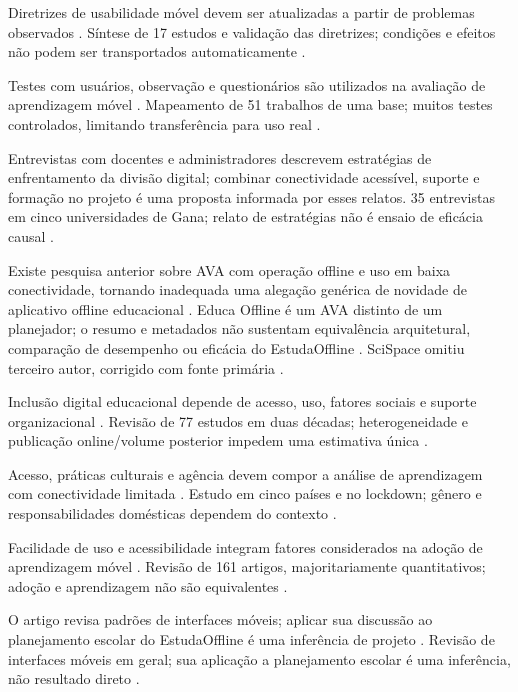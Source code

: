 Diretrizes de usabilidade móvel devem ser atualizadas a partir de problemas observados \citep{kumarguideline2019}. Síntese de 17 estudos e validação das diretrizes; condições e efeitos não podem ser transportados automaticamente \citep{kumarguideline2019}.

Testes com usuários, observação e questionários são utilizados na avaliação de aprendizagem móvel \citep{kumarmapping2024}. Mapeamento de 51 trabalhos de uma base; muitos testes controlados, limitando transferência para uso real \citep{kumarmapping2024}.

Entrevistas com docentes e administradores descrevem estratégias de enfrentamento da divisão digital; combinar conectividade acessível, suporte e formação no projeto é uma proposta informada por esses relatos. 35 entrevistas em cinco universidades de Gana; relato de estratégias não é ensaio de eficácia causal \citep{kumiyeboah2023}.

Existe pesquisa anterior sobre AVA com operação offline e uso em baixa conectividade, tornando inadequada uma alegação genérica de novidade de aplicativo offline educacional \citep{linhalis2026}. Educa Offline é um AVA distinto de um planejador; o resumo e metadados não sustentam equivalência arquitetural, comparação de desempenho ou eficácia do EstudaOffline \citep{linhalis2026}. SciSpace omitiu terceiro autor, corrigido com fonte primária \citep{linhalis2026}.

Inclusão digital educacional depende de acesso, uso, fatores sociais e suporte organizacional \citep{martin2024}. Revisão de 77 estudos em duas décadas; heterogeneidade e publicação online/volume posterior impedem uma estimativa única \citep{martin2024}.

Acesso, práticas culturais e agência devem compor a análise de aprendizagem com conectividade limitada \citep{mathrani2021}. Estudo em cinco países e no lockdown; gênero e responsabilidades domésticas dependem do contexto \citep{mathrani2021}.

Facilidade de uso e acessibilidade integram fatores considerados na adoção de aprendizagem móvel \citep{naveed2023}. Revisão de 161 artigos, majoritariamente quantitativos; adoção e aprendizagem não são equivalentes \citep{naveed2023}.

O artigo revisa padrões de interfaces móveis; aplicar sua discussão ao planejamento escolar do EstudaOffline é uma inferência de projeto \citep{punchoojit2017}. Revisão de interfaces móveis em geral; sua aplicação a planejamento escolar é uma inferência, não resultado direto \citep{punchoojit2017}.

